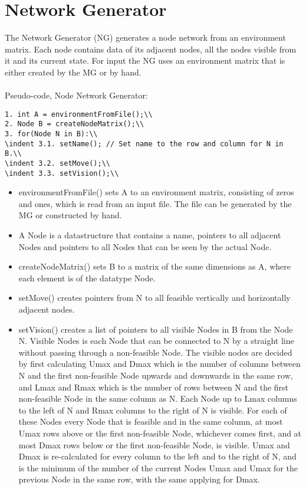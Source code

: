 \section{Network Generator}
The Network Generator (NG) generates a node network from an environment matrix. Each node contains data of its adjacent nodes, all the nodes visible from it and its current state. For input the NG uses an environment matrix that is either created by the MG or by hand.\\
\\
\noindent Pseudo-code, Node Network Generator:\\
\begin{verbatim}
1. int A = environmentFromFile();\\
2. Node B = createNodeMatrix();\\
3. for(Node N in B):\\
\indent 3.1. setName(); // Set name to the row and column for N in B.\\
\indent 3.2. setMove();\\
\indent 3.3. setVision();\\
\end{verbatim}
\begin{itemize}
\item environmentFromFile() sets A to an environment matrix, consisting of zeros and ones, which is read from an input file. The file can be generated by the MG or constructed by hand.\\
\item A Node is a datastructure that contains a name, pointers to all adjacent Nodes and pointers to all Nodes that can be seen by the actual Node.\\
\item createNodeMatrix() sets B to a matrix of the same dimensions as A, where each element is of the datatype Node.\\
\item setMove() creates pointers from N to all feasible vertically and horizontally adjacent nodes.
\item setVision() creates a list of pointers to all visible Nodes in B from the Node N. Visible Nodes is each Node that can be connected to N by a straight line without passing through a non-feasible Node. The visible nodes are decided by first calculating Umax and Dmax which is the number of columns between N and the first non-feasible Node upwards and downwards in the same row, and Lmax and Rmax which is the number of rows between N and the first non-feasible Node in the same column as N. Each Node up to Lmax columns to the left of N and Rmax columns to the right of N is visible. For each of these Nodes every Node that is feasible and in the same column, at most Umax rows above or the first non-feasible Node, whichever comes first, and at most Dmax rows below or the first non-feasible Node, is visible. Umax and Dmax is re-calculated for every column to the left and to the right of N, and is the minimum of the number of the current Nodes Umax and Umax for the previous Node in the same row, with the same applying for Dmax.
\end{itemize}
